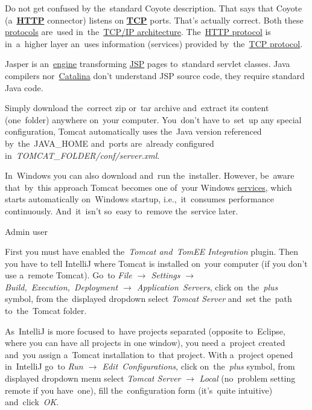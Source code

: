 \warning Do not get confused by the~standard Coyote description.
That says that Coyote (a~\hyperref[http]{\textbf{HTTP}} connector) listens on \hyperref[tcp]{\textbf{TCP}} ports.
That's actually correct.
Both these \hyperref[protocolstandard]{protocols} are~used in~the~\hyperref[tcpip]{TCP/IP architecture}.
The~\hyperref[http]{HTTP protocol} is in~a~higher layer an~uses information (services) provided by~the~\hyperref[tcp]{TCP protocol}.

Jasper is an~\hyperref[engine]{engine} transforming \hyperref[jsp]{JSP} pages to~standard servlet classes.
Java compilers nor~\hyperref[catalina]{Catalina} don't understand JSP source code, they require standard Java code.

Simply download the~correct zip or~tar archive and~extract its content (one~folder) anywhere on~your computer.
You~don't have to~set~up any special configuration, Tomcat automatically uses the~Java version referenced by~the~JAVA\_HOME and~ports are~already configured in~\textit{TOMCAT\_FOLDER/conf/server.xml}.

\warning In~Windows you can also download and~run the~installer.
However, be~aware that~by~this approach Tomcat becomes one of~your Windows \hyperref[applicationprocessprogramservicethread]{services}, which starts automatically on~Windows startup, i.e.,~it~consumes performance continuously.
And~it~isn't so~easy to~remove the~service later.

\todo Admin user




First you must have enabled the~\textit{Tomcat and~TomEE Integration} plugin.
Then you have to tell IntelliJ where Tomcat is installed on~your computer (if you don't use a~remote Tomcat).
Go~to \textit{File $\rightarrow$ Settings $\rightarrow$ Build,~Execution,~Deployment $\rightarrow$ Application~Servers}, click on~the~\textit{plus} symbol, from the~displayed dropdown select \textit{Tomcat Server} and~set the~path to~the~Tomcat folder.

As~IntelliJ is more focused to~have projects separated (opposite to~Eclipse, where you can have all projects in one window), you need a~project created and~you assign a~Tomcat installation to~that project.
With a~project opened in~IntelliJ go~to \textit{Run $\rightarrow$ Edit~Configurations}, click on~the~\textit{plus} symbol, from displayed dropdown menu select \textit{Tomcat Server} $\rightarrow$ \textit{Local} (no~problem setting remote if you have~one), fill the~configuration form (it's~quite intuitive) and~click~\textit{OK}.

